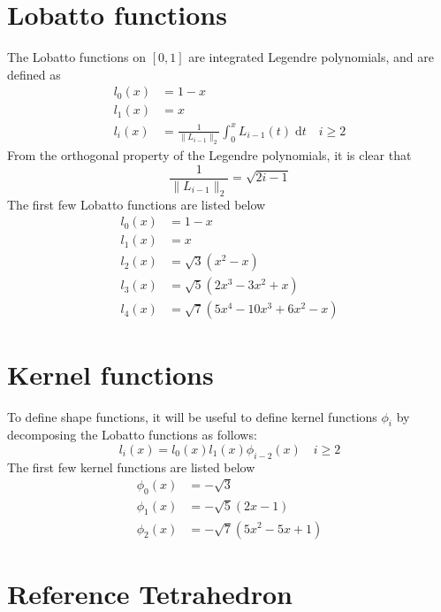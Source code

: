 \documentclass{article}
\begin{document}
\section{Lobatto functions}

The Lobatto functions on $[0,1]$ are integrated Legendre polynomials, and
are defined as
\begin{align*}
l_0(x) &= 1-x \\
l_1(x) &= x \\
l_i(x) & = \frac{1}{ \| L_{i-1} \|_2}
\int _0 ^x L_{i-1}(t) \; \text{d}t \quad i \geq 2
\end{align*}
From the orthogonal property of the Legendre polynomials, it is clear that
\[
\frac{1}{ \| L_{i-1} \|_2} = \sqrt{2i - 1}
\]
The first few Lobatto functions are listed below
\begin{align*}
l_0(x) &= 1-x \\
l_1(x) &= x \\
l_2(x) &= \sqrt{3} (x^2 - x) \\
l_3(x) &= \sqrt{5} (2x^3 - 3x^2 + x) \\
l_4(x) &= \sqrt{7} (5x^4 - 10x^3 + 6x^2 - x)
\end{align*}

\section{Kernel functions}

To define shape functions, it will be useful to define kernel functions
$\phi_i$ by decomposing the Lobatto functions as follows:
\[
l_i(x) = l_0(x) l_1(x) \phi_{i-2}(x) \quad i \geq 2
\]
The first few kernel functions are listed below
\begin{align*}
\phi_0(x) &= -\sqrt{3} \\
\phi_1(x) &= -\sqrt{5} (2x - 1) \\
\phi_2(x) &= -\sqrt{7} (5x^2 - 5x + 1)
\end{align*}

\section{Reference Tetrahedron}
\end{document}
